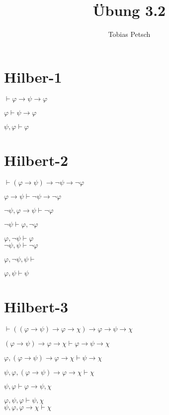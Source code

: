 \documentclass[a4paper,12pt]{article}
\title{Übung 3.2}
\author{Tobias Petsch}
\date{}
\begin{document}
\maketitle



\section*{Hilber-1}

$\vdash \varphi \to \psi \to \varphi$

$\varphi \vdash \psi \to \varphi$

$\psi, \varphi \vdash \varphi$

\section*{Hilbert-2}

$\vdash (\varphi \to \psi) \to \neg \psi \to \neg \varphi$

$\varphi \to \psi \vdash \neg \psi \to \neg \varphi$

$\neg \psi, \varphi \to \psi \vdash \neg \varphi$

$\neg \psi \vdash \varphi, \neg \varphi$

$\varphi, \neg \psi \vdash \varphi$ \\


$\neg \psi, \psi \vdash \neg \varphi$

$\varphi, \neg \psi, \psi \vdash$

$\varphi, \psi \vdash \psi$

\section*{Hilbert-3}

$\vdash ((\varphi \to \psi) \to \varphi \to \chi) \to \varphi \to \psi \to \chi$

$(\varphi \to \psi) \to \varphi \to \chi \vdash \varphi \to \psi \to \chi$

$\varphi, (\varphi \to \psi) \to \varphi \to \chi \vdash \psi \to \chi$

$\psi, \varphi, (\varphi \to \psi) \to \varphi \to \chi \vdash \chi$

$\psi, \varphi \vdash \varphi \to \psi, \chi$

$\varphi, \psi, \varphi \vdash \psi, \chi$ \\


$\psi, \varphi, \varphi \to \chi \vdash \chi$
\end{document}
